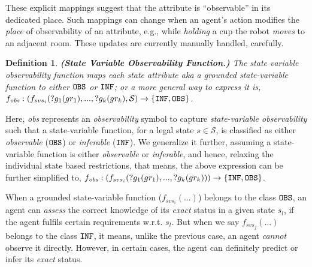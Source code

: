 \documentclass[letterpaper]{article} %
\newtheorem{definition}{Definition}
\begin{document}
These explicit mappings suggest that the attribute is ``observable'' in its dedicated place. Such mappings can change when an agent's action modifies the \textit{place} of observability of an attribute, e.g., 
while \textit{holding} a cup the robot \textit{moves} to an adjacent room. 
These updates are currently manually handled, carefully.

\begin{definition} \label{def:svof}
\textbf{(State Variable Observability Function.)} 
The state variable observability function maps each state attribute {\em aka} a grounded \textit{state-variable function} 
to either $\texttt{OBS}$ or $\texttt{INF}$; or a more general way to express it is, $f_{\textit{obs}}: (f_{svs_i}(?g_1(gr_1),...,?g_k(gr_k),\mathcal{S}
) \rightarrow 
    \{\texttt{INF}, \texttt{OBS}\}$.
\end{definition}
Here, \textit{obs} represents an \textit{observability} symbol to capture \textit{state-variable observability} such that a state-variable function, for a legal state $s\in\mathcal{S}$, is classified as either \textit{observable} ($\texttt{OBS}$) or \textit{inferable} ($\texttt{INF}$). 
We generalize it further, assuming a state-variable function is either \textit{observable} or \textit{inferable}, and hence, relaxing the individual state based restrictions, that means, the above expression can be further simplified to, 
$f_{\textit{obs}}: (f_{svs_i}(?g_1(gr_1),...,?g_k(gr_k))) \rightarrow \{\texttt{INF}, \texttt{OBS}\}$.

When a grounded state-variable function ($f_{svs_i}(...)$) belongs to the class $\texttt{OBS}$, an agent can \textit{assess} the correct knowledge of its \textit{exact} status in a given state $s_l$, if the agent fulfils certain requirements w.r.t. $s_l$. 
But when we say $f_{svs_j}(...)$ belongs to the class $\texttt{INF}$, it means, unlike the previous case, an agent \textit{cannot} observe it directly. 
However, in certain cases, the agent can definitely predict or infer its \textit{exact} status. 
\end{document}
